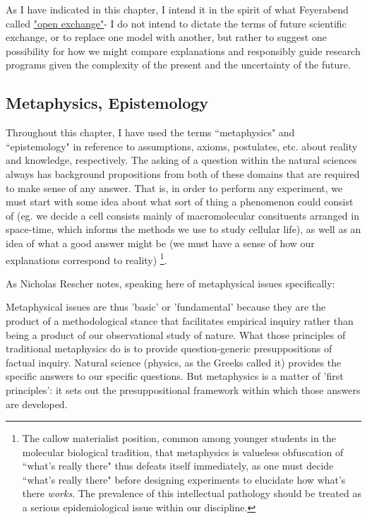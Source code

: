  As I have indicated in this chapter, I intend it in the spirit of what Feyerabend called \hyperref[open]{"open exchange"}-  I do not intend to dictate the terms of future scientific exchange, or to replace one model with another, but rather to suggest one possibility for how we might compare explanations and responsibly guide research programs given the complexity of the present and the uncertainty of the future.

\subsection{Metaphysics, Epistemology}
 Throughout this chapter, I have used the terms ``metaphysics" and ``epistemology" in reference to assumptions, axioms, postulates, etc. about reality and knowledge, respectively. The asking of a question within the natural sciences always has background propositions from both of these domains that are required to make sense of any answer. That is, in order to perform any experiment, we must start with some idea about what sort of thing a phenomenon could consist of (eg. we decide a cell consists mainly of macromolecular consituents arranged in space-time, which informs the methods we use to study cellular life), as well as an idea of what a good answer might be (we must have a sense of how our explanations correspond to reality) \footnote{The callow materialist position, common among younger students in the molecular biological tradition, that metaphysics is valueless obfuscation of ``what's really there" thus defeats itself immediately, as one must decide ``what's really there" before designing experiments to elucidate how what's there \textit{works}. The prevalence of this intellectual pathology should be treated as a serious epidemiological issue within our discipline.}.
 
 As Nicholas Rescher notes, speaking here of metaphysical issues specifically:
 
 \begin{longquote}
 Metaphysical issues are thus 'basic' or 'fundamental' because they are the product of a methodological stance that facilitates empirical inquiry rather than being a product of our observational study of nature. What those principles of traditional metaphysics do is to provide question-generic presuppositions of factual inquiry. Natural science (physics, as the Greeks called it) provides the specific answers to our specific questions. But metaphysics is a matter of 'first principles': it sets out the presuppositional framework within which those answers are developed.
 \cite[p.4]{Rescher2000}
 \end{longquote}
 
